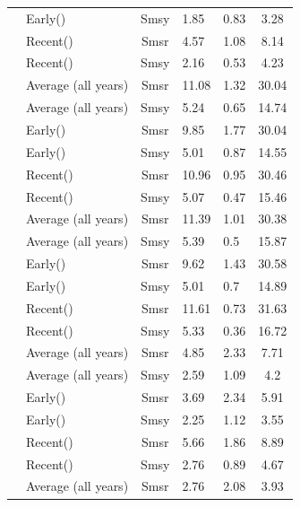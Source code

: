 \documentclass[11pt]{book}
\begin{document}
\begin{longtable}[t]{llcllc}
\cmidrule{2-6}\nopagebreak  & Early() & Smsy & 1.85 & 0.83 & 3.28\\
\cmidrule{2-6}\nopagebreak  & Recent() & Smsr & 4.57 & 1.08 & 8.14\\
\cmidrule{2-6}\nopagebreak \multirow{-6}{*}{\raggedright\arraybackslash Nordenskiold} & Recent() & Smsy & 2.16 & 0.53 & 4.23\\
\cmidrule{1-6}\pagebreak[0]  & Average (all years) & Smsr & 11.08 & 1.32 & 30.04\\
\cmidrule{2-6}\nopagebreak  & Average (all years) & Smsy & 5.24 & 0.65 & 14.74\\
\cmidrule{2-6}\nopagebreak  & Early() & Smsr & 9.85 & 1.77 & 30.04\\
\cmidrule{2-6}\nopagebreak  & Early() & Smsy & 5.01 & 0.87 & 14.55\\
\cmidrule{2-6}\nopagebreak  & Recent() & Smsr & 10.96 & 0.95 & 30.46\\
\cmidrule{2-6}\nopagebreak \multirow{-6}{*}{\raggedright\arraybackslash NorthernYukonR andtribs} & Recent() & Smsy & 5.07 & 0.47 & 15.46\\
\cmidrule{1-6}\pagebreak[0]  & Average (all years) & Smsr & 11.39 & 1.01 & 30.38\\
\cmidrule{2-6}\nopagebreak  & Average (all years) & Smsy & 5.39 & 0.5 & 15.87\\
\cmidrule{2-6}\nopagebreak  & Early() & Smsr & 9.62 & 1.43 & 30.58\\
\cmidrule{2-6}\nopagebreak  & Early() & Smsy & 5.01 & 0.7 & 14.89\\
\cmidrule{2-6}\nopagebreak  & Recent() & Smsr & 11.61 & 0.73 & 31.63\\
\cmidrule{2-6}\nopagebreak \multirow{-6}{*}{\raggedright\arraybackslash Pelly} & Recent() & Smsy & 5.33 & 0.36 & 16.72\\
\cmidrule{1-6}\pagebreak[0]  & Average (all years) & Smsr & 4.85 & 2.33 & 7.71\\
\cmidrule{2-6}\nopagebreak  & Average (all years) & Smsy & 2.59 & 1.09 & 4.2\\
\cmidrule{2-6}\nopagebreak  & Early() & Smsr & 3.69 & 2.34 & 5.91\\
\cmidrule{2-6}\nopagebreak  & Early() & Smsy & 2.25 & 1.12 & 3.55\\
\cmidrule{2-6}\nopagebreak  & Recent() & Smsr & 5.66 & 1.86 & 8.89\\
\cmidrule{2-6}\nopagebreak \multirow{-6}{*}{\raggedright\arraybackslash Stewart} & Recent() & Smsy & 2.76 & 0.89 & 4.67\\
\cmidrule{1-6}\pagebreak[0]  & Average (all years) & Smsr & 2.76 & 2.08 & 3.93\\

\end{longtable}
\end{document}
